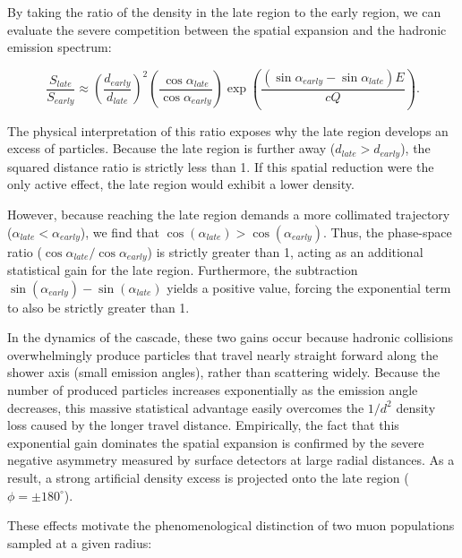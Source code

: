 \documentclass[11pt,a4paper]{article}
\begin{document}
By taking the ratio of the density in the late region to the early region, we can evaluate the severe competition between the spatial expansion and the hadronic emission spectrum:

\begin{equation}
   \frac{S_{late}}{S_{early}} \approx \left( \frac{d_{early}}{d_{late}} \right)^2 \left( \frac{\cos \alpha_{late}}{\cos \alpha_{early}} \right) \exp\left( \frac{(\sin \alpha_{early} - \sin \alpha_{late}) E}{cQ} \right).
\end{equation}



The physical interpretation of this ratio exposes why the late region develops an excess of particles. Because the late region is further away ($d_{late} > d_{early}$), the squared distance ratio is strictly less than 1. If this spatial reduction were the only active effect, the late region would exhibit a lower density.

However, because reaching the late region demands a more collimated trajectory ($\alpha_{late} < \alpha_{early}$), we find that $\cos(\alpha_{late}) > \cos(\alpha_{early})$. Thus, the phase-space ratio ($\cos\alpha_{late}/\cos\alpha_{early}$) is strictly greater than 1, acting as an additional statistical gain for the late region. Furthermore, the subtraction $\sin(\alpha_{early}) - \sin(\alpha_{late})$ yields a positive value, forcing the exponential term to also be strictly greater than 1. 

In the dynamics of the cascade, these two gains occur because hadronic collisions overwhelmingly produce particles that travel nearly straight forward along the shower axis (small emission angles), rather than scattering widely. Because the number of produced particles increases exponentially as the emission angle decreases, this massive statistical advantage easily overcomes the $1/d^2$ density loss caused by the longer travel distance. Empirically, the fact that this exponential gain dominates the spatial expansion is confirmed by the severe negative asymmetry measured by surface detectors at large radial distances. As a result, a strong artificial density excess is projected onto the late region ($\phi = \pm 180^\circ$).

These effects motivate the phenomenological distinction of two muon populations sampled at a given radius:
\end{document}
